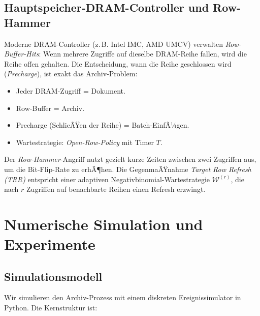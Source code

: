 ﻿\documentclass[12pt, a4paper]{article}
\begin{document}
\subsection{Hauptspeicher-DRAM-Controller und Row-Hammer}

Moderne DRAM-Controller (z.\,B. Intel IMC, AMD UMCV) verwalten
\emph{Row-Buffer-Hits}: Wenn mehrere Zugriffe auf dieselbe DRAM-Reihe fallen,
wird die Reihe offen gehalten. Die Entscheidung, wann die Reihe geschlossen
wird (\emph{Precharge}), ist exakt das Archiv-Problem:
\begin{itemize}[noitemsep]
  \item Jeder DRAM-Zugriff = Dokument.
  \item Row-Buffer = Archiv.
  \item Precharge (SchlieÃŸen der Reihe) = Batch-EinfÃ¼gen.
  \item Wartestrategie: \emph{Open-Row-Policy} mit Timer $T$.
\end{itemize}

Der \emph{Row-Hammer}-Angriff nutzt gezielt kurze Zeiten zwischen zwei
Zugriffen aus, um die Bit-Flip-Rate zu erhÃ¶hen. Die GegenmaÃŸnahme
\emph{Target Row Refresh (TRR)} entspricht einer adaptiven
Negativbinomial-Wartestrategie $\mathcal{W}^{(r)}$, die nach $r$ Zugriffen
auf benachbarte Reihen einen Refresh erzwingt.

\section{Numerische Simulation und Experimente}\label{sec:simulation}

\subsection{Simulationsmodell}

Wir simulieren den Archiv-Prozess mit einem diskreten Ereignissimulator in
Python. Die Kernstruktur ist:
\end{document}
